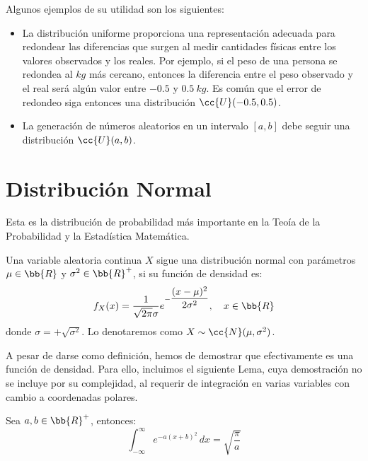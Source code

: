 Algunos ejemplos de su utilidad son los siguientes:
\begin{itemize}
    \item La distribución uniforme proporciona una representación adecuada para
    redondear las diferencias que surgen al medir cantidades físicas entre los
    valores observados y los reales.
    Por ejemplo, si el peso de una persona se redondea al $kg$ más cercano,
    entonces la diferencia entre el peso observado y el real será algún valor entre
    $-0.5$ y $0.5~kg$. Es común que el error de redondeo siga entonces una distribución
    $\cc{U}(-0.5,0.5)$.
    
    \item La generación de números aleatorios en un intervalo $[a,b]$ debe seguir una distribución
    $\cc{U}(a,b)$.
\end{itemize}


\section{Distribución Normal}

Esta es la distribución de probabilidad más importante en la Teoía de la Probabilidad y la Estadística Matemática.

\begin{definicion}
    Una variable aleatoria continua $X$ sigue una distribución normal con parámetros $\mu\in \bb{R}$ y $\sigma^2 \in \bb{R}^+$, si su función de densidad es:
    \begin{equation*}
        f_X(x) = \dfrac{1}{\sqrt{2\pi}\sigma} e^{-\dfrac{(x-\mu)^2}{2\sigma^2}}, \quad x\in \bb{R}
    \end{equation*}
    donde $\sigma=+\sqrt{\sigma^2}$.
    Lo denotaremos como $X\sim \cc{N}(\mu,\sigma^2)$.
\end{definicion}

A pesar de darse como definición, hemos de demostrar que efectivamente es una función de densidad.
Para ello, incluimos el siguiente Lema, cuya demostración no se incluye por su complejidad,
al requerir de integración en varias variables con cambio a coordenadas polares.
\begin{lema}
    Sea $a,b\in \bb{R}^+$, entonces:
    \begin{equation*}
        \int_{-\infty}^{\infty} e^{-a(x+b)^2} \, dx = \sqrt{\dfrac{\pi}{a}}
    \end{equation*}
\end{lema}

